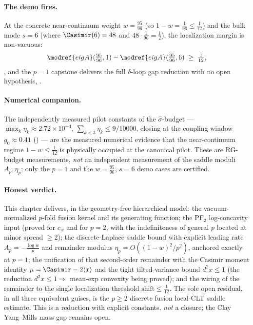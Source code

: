 \paragraph{The demo fires.}
At the concrete near-continuum weight $w=\tfrac{95}{96}$ (so
$1-w=\tfrac1{96}\le\tfrac1{12}$) and the bulk mode $s=6$ (where
$\Casimir(6)=48$ and $48\cdot\tfrac1{96}=\tfrac12$), the localization margin is
non-vacuous:
\[
  \modref{eigA}(\tfrac{95}{96},1) - \modref{eigA}(\tfrac{95}{96},6) \;\ge\; \tfrac1{12},
\]
, and the $p=1$ capstone
delivers the full $\delta$-loop gap reduction with no open hypothesis,
.

\paragraph{Numerical companion.}
The independently measured pilot constants of the \SUtwo{}
$\widehat\sigma$-budget — $\max_k\eta_k\approx 2.72\times10^{-4}$,
$\sum_{k<3}\eta_k\le 9/10000$, closing at the coupling window $g_0\approx 0.41$
() — are the measured numerical evidence that the
near-continuum regime $1-w\le\tfrac1{12}$ is physically occupied at the canonical
pilot.  These are RG-budget measurements, \emph{not} an independent measurement of
the saddle moduli $A_p,\eta_p$; only the $p=1$ and the $w=\tfrac{95}{96}$, $s=6$
demo cases are certified.

\paragraph{Honest verdict.}
This chapter delivers, in the geometry-free hierarchical model: the vacuum-normalized
$p$-fold fusion kernel and its generating function; the PF$_2$ log-concavity input
(proved for $c_w$ and for $p=2$, with the indefiniteness of general $p$ located at
minor spread $\ge 2$); the discrete-Laplace saddle bound with explicit leading rate
$A_p=-\tfrac{\log w}{p}$ and remainder modulus $\eta_p=O((1-w)^2/p^2)$, anchored
exactly at $p=1$; the unification of that second-order remainder with the Casimir
moment identity $\mu=\Casimir-2\langle x\rangle$ and the tight tilted-variance bound
$d^2x\le 1$ (the reduction $d^2x\le1\Rightarrow$ mean-exp convexity being proved);
and the wiring of the remainder to the single localization threshold
$\mathrm{shift}\le\tfrac1{12}$.  The sole open residual, in all three equivalent
guises, is the $p\ge 2$ discrete \SUtwo{} fusion local-CLT saddle estimate.  This is
a reduction with explicit constants, \emph{not} a closure; the Clay Yang--Mills mass
gap remains open.
